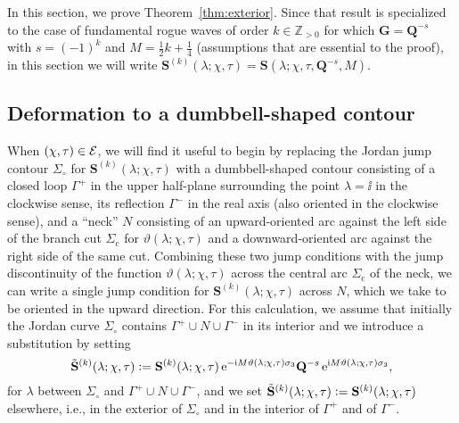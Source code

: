 \label{sec:Schi-Stau}
In this section, we prove Theorem~\ref{thm:exterior}.  Since that result is specialized to the case of fundamental rogue waves of order $k\in\mathbb{Z}_{>0}$ for which $\mathbf{G}=\mathbf{Q}^{-s}$ with $s=(-1)^k$ and $M=\tfrac{1}{2}k+\tfrac{1}{4}$ (assumptions that are essential to the proof), in this section we will write $\mathbf{S}^{(k)}(\lambda;\chi,\tau)=\mathbf{S}(\lambda;\chi,\tau,\mathbf{Q}^{-s},M)$.
\subsection{Deformation to a dumbbell-shaped contour}
\label{sec:dumbbell}
When $(\chi,\tau)\in \mathcal{E}$, we will find it useful to begin by replacing the Jordan jump contour $\Sigma_\circ$ for $\mathbf{S}^{(k)}(\lambda;\chi,\tau)$ with a dumbbell-shaped contour consisting of a closed loop $\Gamma^+$ in the upper half-plane surrounding the point $\lambda=\ii$ in the clockwise sense, its reflection $\Gamma^-$ in the real axis (also oriented in the clockwise sense), and a ``neck'' $N$ consisting of an upward-oriented arc against the left side of the branch cut $\Sigma_\mathrm{c}$ for $\vartheta(\lambda;\chi,\tau)$ and a downward-oriented arc against the right side of the same cut.  Combining these two jump conditions with the jump discontinuity of the function $\vartheta(\lambda;\chi,\tau)$ across the central arc $\Sigma_\mathrm{c}$ of the neck, we can write a single jump condition for $\mathbf{S}^{(k)}(\lambda;\chi,\tau)$ across $N$, which we take to be oriented in the upward direction.  For this calculation, we assume that initially the Jordan curve $\Sigma_\circ$ contains $\Gamma^+\cup N\cup \Gamma^-$ in its interior and we introduce a substitution by setting
\begin{equation}
\tilde{\mathbf{S}}^{(k)}(\lambda;\chi,\tau)\vcentcolon=
\mathbf{S}^{(k)}(\lambda;\chi,\tau)\,\mathrm{e}^{-\mathrm{i} M\vartheta(\lambda;\chi,\tau)\sigma_3}\mathbf{Q}^{-s}\,\mathrm{e}^{\mathrm{i} M\vartheta(\lambda;\chi,\tau)\sigma_3},
\label{eq:S-Stilde-ALT}
\end{equation}
for $\lambda$ between $\Sigma_\circ$ and $\Gamma^+\cup N\cup \Gamma^-$, and we set $\tilde{\mathbf{S}}^{(k)}(\lambda;\chi,\tau)\vcentcolon=\mathbf{S}^{(k)}(\lambda;\chi,\tau)$ elsewhere, i.e., in the exterior of $\Sigma_\circ$ and in the interior of $\Gamma^+$ and of $\Gamma^-$.  

